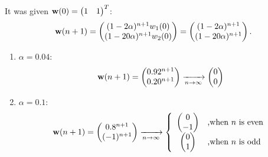 \begin{enumerate}
\begin{solution}
    It was given ${\bf{w}}(0) = \begin{pmatrix} 1 & 1 \end{pmatrix}^T$:
    \begin{equation*}
      {\bf{w}}(n+1) = \begin{pmatrix} (1 - 2 \alpha)^{n+1} w_1(0) \\  (1 - 20
        \alpha)^{n+1} w_2(0) \end{pmatrix} = \begin{pmatrix} (1 - 2
        \alpha)^{n+1} \\  (1 - 20 \alpha)^{n+1} \end{pmatrix}. 
    \end{equation*}

    \begin{enumerate}
    \item $\alpha = 0.04$: 
      \begin{equation*}
        {\bf{w}}(n+1) = \begin{pmatrix} 0.92^{n+1} \\
          0.20^{n+1} \end{pmatrix} \xrightarrow[n\rightarrow\infty]{}\begin{pmatrix}0\\0\end{pmatrix}
      \end{equation*}

    \item $\alpha = 0.1$: 
      \begin{equation*}
        {\bf{w}}(n+1) = \begin{pmatrix} 0.8^{n+1} \\
          (-1)^{n+1} \end{pmatrix} \xrightarrow[n\rightarrow\infty]{}\left\{\begin{array}{cl}\begin{pmatrix}0\\-1\end{pmatrix} & \mbox{,when } n\mbox{ is even}\\
            \begin{pmatrix}0\\1\end{pmatrix} & \mbox{,when } n\mbox{ is odd}\end{array}\right.
      \end{equation*}


\end{enumerate}
\end{solution}
\end{enumerate}
